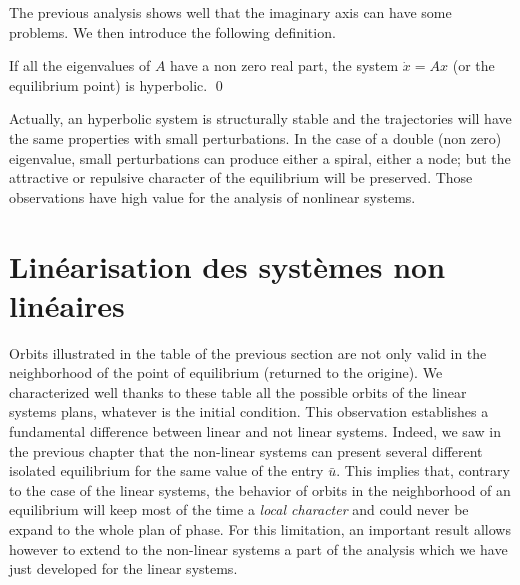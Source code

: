 The previous analysis shows well that the imaginary axis can have some problems. We then introduce the following definition.

\begin{definition} \label{hyperbolique} 
If all the eigenvalues of $A$ have a non zero real part, the system
$\dot x=A x$ (or the equilibrium point)
is hyperbolic. \qed 
\end{definition}

Actually, an hyperbolic system is structurally stable and the trajectories will have the same properties with small perturbations. In the case of a double (non zero) eigenvalue, small perturbations can produce either a spiral, either a node; but the attractive or repulsive character  of the equilibrium will be preserved. Those observations have high value for the analysis of nonlinear systems.

 

 \section{Linéarisation des systèmes non linéaires}

Orbits illustrated in the table of the previous section are not only valid in the neighborhood of the point of equilibrium (returned to the origine). We characterized well thanks to these table all the possible orbits of the linear systems plans, whatever is the initial condition. This observation establishes a fundamental difference between linear and not linear systems. Indeed, we saw in the previous chapter that the non-linear systems can present several different isolated equilibrium for the same value of the entry $\bar u$. This implies that, contrary to the case of the linear systems, the behavior of orbits in the neighborhood of an equilibrium will keep most of the time a \textit{local character} and could never be expand to the whole plan of phase.
For this limitation, an important result allows however to extend to the non-linear systems a part of the analysis which we have just developed for the linear systems.


